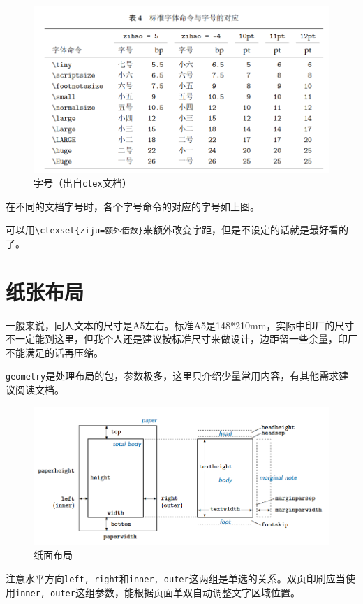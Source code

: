 \documentclass[10pt,openany]{book}
\begin{document}
\begin{figure}[H]
    \centering
    \includegraphics[width=\linewidth]{data/fontsize.png}
    \caption{字号（出自\texttt{ctex}文档）}
\end{figure}

在不同的文档字号时，各个字号命令的对应的字号如上图。

可以用\texttt{\textbackslash{}ctexset\{ziju=额外倍数\}}来额外改变字距，但是不设定的话就是最好看的了。

\section{纸张布局}

一般来说，同人文本的尺寸是A5左右。标准A5是148*210mm，实际中印厂的尺寸不一定能到这里，但我个人还是建议按标准尺寸来做设计，边距留一些余量，印厂不能满足的话再压缩。

\texttt{geometry}是处理布局的包，参数极多，这里只介绍少量常用内容，有其他需求建议阅读文档。

\begin{figure}[H]
    \centering
    \includegraphics[width=.8\linewidth]{data/paper.png}
    \caption{纸面布局}
\end{figure}

注意水平方向\texttt{left,\ right}和\texttt{inner,\ outer}这两组是单选的关系。双页印刷应当使用\texttt{inner,\ outer}这组参数，能根据页面单双自动调整文字区域位置。
\end{document}
